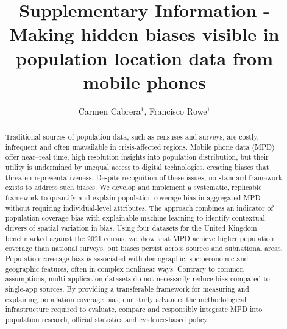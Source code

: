 \documentclass[]{rsos}%
\begin{document}
\title{Supplementary Information - Making hidden biases visible in population location data from mobile phones}

\author{
Carmen Cabrera$^{1}$,
Francisco Rowe$^{1}$}

\address{
  $^{1}$Geographic Data Science Lab, Department of Geography and Planning, University of Liverpool, Liverpool, United Kingdom.\\
  $^{}$}
\subject{
Mobile phone data,
Human mobility,
Explainable AI,
Spatial analysis}



\begin{abstract}
Traditional sources of population data, such as censuses and surveys, are costly, infrequent and often unavailable in crisis-affected regions. Mobile phone data (MPD) offer near--real-time, high-resolution insights into population distribution, but their utility is undermined by unequal access to digital technologies, creating biases that threaten representativeness. Despite recognition of these issues, no standard framework exists to address such biases. We develop and implement a systematic, replicable framework to quantify and explain population coverage bias in aggregated MPD without requiring individual-level attributes. The approach combines an indicator of population coverage bias with explainable machine learning to identify contextual drivers of spatial variation in bias. Using four datasets for the United Kingdom benchmarked against the 2021 census, we show that MPD achieve higher population coverage than national surveys, but biases persist across sources and subnational areas. Population coverage bias is associated with demographic, socioeconomic and geographic features, often in complex nonlinear ways. Contrary to common assumptions, multi-application datasets do not necessarily reduce bias compared to single-app sources. By providing a transferable framework for measuring and explaining population coverage bias, our study advances the methodological infrastructure required to evaluate, compare and responsibly integrate MPD into population research, official statistics and evidence-based policy.
\end{abstract}
\end{document}
